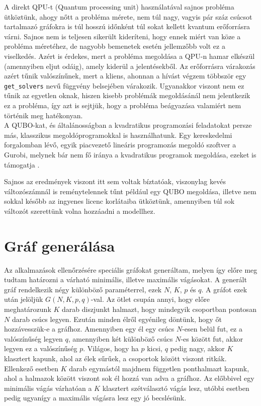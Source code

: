 A direkt QPU-t (Quantum processing unit) használatával sajnos probléma ütköztünk, ahogy nőtt a probléma mérete, nem túl nagy, vagyis pár száz csúcsot tartalmazó gráfokra is túl hosszú időnként túl sokat kellett kvantum erőforrásra várni. Sajnos nem is teljesen sikerült kideríteni, hogy ennek miért van köze a probléma méretéhez, de nagyobb bemenetek esetén jellemzőbb volt ez a viselkedés. Azért is érdekes, mert a probléma megoldása a QPU-n hamar elkészül (amennyiben eljut odáig), amely kiderül a jelentésekből. Az erőforrásra várakozás azért tűnik valószínűnek, mert a kliens, ahonnan a hívást végzem többször egy \verb+get_solvers+ nevű függvény belsejében várakozik. Ugyanakkor viszont nem ez tűnik az egyetlen oknak, hiszen kisebb problémák megoldásánál nem jelentkezik ez a probléma, így azt is sejtjük, hogy a probléma beágyazása valamiért nem történik meg hatékonyan.\\



A QUBO-kat, és általánosságban a kvadratikus programozási feladatokat persze más, klasszikus megoldóprogramokkal is használhatunk. Egy kereskedelmi forgalomban lévő, egyik piacvezető lineáris programozás megoldó szoftver a Gurobi, melynek bár nem fő iránya a kvadratikus programok megoldása, ezeket is támogatja \cite{gurobi}. 

Sajnos az eredmények viszont itt sem voltak bíztatóak, viszonylag kevés változószámnál is reménytelennek tűnt például egy QUBO megoldása, illetve nem sokkal később az ingyenes licenc korlátaiba ütköztünk, amennyiben túl sok változót szerettünk volna hozzáadni a modellhez. 



\section{Gráf generálása}
Az alkalmazások ellenőrzésére speciális gráfokat generáltam, melyen így előre meg tudtam határozni a várható minimális, illetve maximális vágásokat.
A generált gráf rendelkezik négy különböző paraméterrel, ezek $N$, $K$, $p$ és $q$.
A gráfot ezek után jelöljük $G(N,K,p,q)$-val.
Az ötlet csupán annyi, hogy előre meghatározunk $K$ darab diszjunkt halmazt, hogy mindegyik csoportban pontosan $N$ darab csúcs legyen. Ezután minden élről egyénileg döntünk, hogy őt hozzávesszük-e a gráfhoz. Amennyiben egy él egy csúcs $N$-esen belül fut, ez a valószínűség legyen $q$, amennyiben két különböző csúcs $N$-es között fut, akkor legyen ez a valószínűség $p$. Világos, hogy ha $p$ kicsi, $q$ pedig nagy, akkor $K$ klasztert kapunk, ahol az élek sűrűek, a csoportok között viszont ritkák. Ellenkező esetben $K$ darab egymástól majdnem független ponthalmazt kapunk, ahol a halmazok között viszont sok él hozzá van adva a gráfhoz. Az előbbivel egy minimális vágás várhatóan a $K$ klasztert szétválasztó vágás lesz, utóbbi esetben pedig ugyanígy a maximális vágásra lesz egy jó becslésünk.

